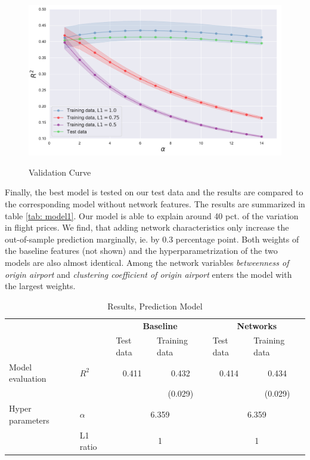 \begin{figure}[H]
  \centering
  \caption{Validation Curve}
    \includegraphics[width=1. \textwidth]{Exam/Figures/validation_curve.pdf}
  \label{fig:validation curve}
\end{figure}
Finally, the best model is tested on our test data and the results are compared to the corresponding model without network features. The results are summarized in table \ref{tab: model1}. Our model is able to explain around 40 pct. of the variation in flight prices. We find, that adding network characteristics only increase the out-of-sample prediction marginally, ie. by 0.3 percentage point. Both weights of the baseline features (not shown) and the hyperparametrization of the two models are also almost identical. Among the network variables \textit{betweenness of origin airport} and \textit{clustering coefficient of origin airport} enters the model with the largest weights.   \\ 


\begin{table}[htbp]
\label{tab: model1}
  \centering
  \caption{Results, Prediction Model}
    \begin{tabular}{rlcccc}
    \hline
          &       & \multicolumn{2}{c}{\textbf{Baseline}} & \multicolumn{2}{c}{\textbf{Networks}} \\ 
          &       & \multicolumn{1}{l}{Test data} & \multicolumn{1}{l}{Training data} & \multicolumn{1}{l}{Test data} & \multicolumn{1}{l}{Training data} \\ \hline
    \multicolumn{1}{l}{Model evaluation} & $R^2$  & \multicolumn{1}{c}{0.411} & \multicolumn{1}{c}{0.432} & \multicolumn{1}{c}{0.414} & \multicolumn{1}{c}{0.434} \\
          &       &  &  \multicolumn{1}{c}{(0.029)}     &       & \multicolumn{1}{c}{(0.029)} \\
    \multicolumn{1}{l}{Hyper parameters} & $\alpha$ & \multicolumn{2}{c}{6.359} & \multicolumn{2}{c}{6.359} \\
          & L1 ratio & \multicolumn{2}{c}{1} & \multicolumn{2}{c}{1} \\ \hline
    \end{tabular}%
  \label{tab:addlabel}%
\end{table}%


